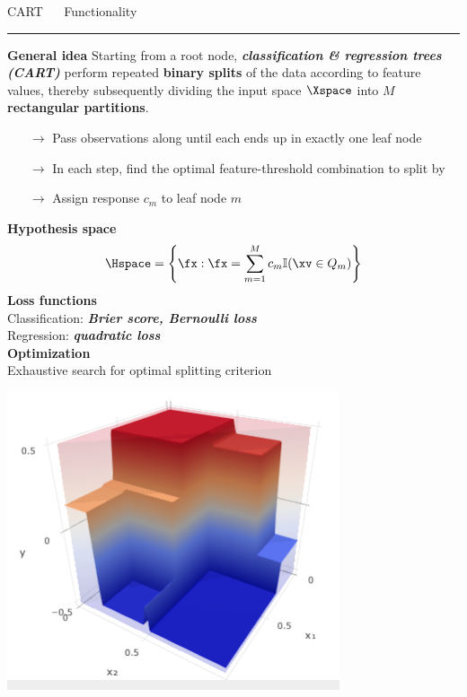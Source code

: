 \documentclass[11pt,compress,t,notes=noshow, xcolor=table]{beamer}
\begin{document}
\begin{frame}{\textcolor{gray!80}{CART} ~~ Functionality}
\noindent \textcolor{gray!80}{\rule{\textwidth}{1pt}}

\vspace{0.3cm}

\textbf{\textcolor{gray!80}{General idea}} {} Starting from a root node, 
\textit{\textbf{classification \& regression trees (CART)}} 
perform repeated \textbf{binary splits} of the data according to feature values, 
thereby subsequently dividing the input space $\Xspace$ into $M$ 
\textbf{rectangular partitions}.

\begin{itemize}
  \item [$\rightarrow$] Pass observations along until each ends up in exactly 
  one leaf node
  \item [$\rightarrow$] In each step, find the optimal feature-threshold
  combination to split by
  \item [$\rightarrow$] Assign response $c_m$ to leaf node $m$
\end{itemize}

\vspace{0.3cm}

\begin{minipage}{0.6\textwidth}
  \textbf{\textcolor{gray!80}{Hypothesis space}} \\
  $$\Hspace = \left\{ \fx: \fx = \sum_{m = 1}^M c_m \mathbb{I}(\xv \in Q_m) 
  \right\}$$
  \smallskip
  \textbf{\textcolor{gray!80}{Loss functions}} \\
  Classification: \textit{\textbf{Brier score, Bernoulli loss}}  \\
  \smallskip
  Regression: \textit{\textbf{quadratic loss}} \\
  \smallskip
  \textbf{\textcolor{gray!80}{Optimization}} \\
  Exhaustive search for optimal splitting criterion
\end{minipage}%
\begin{minipage}{0.4\textwidth}
  \includegraphics[width=\textwidth]{figure/cart_3d.PNG}
\end{minipage}


\end{frame}
\end{document}
